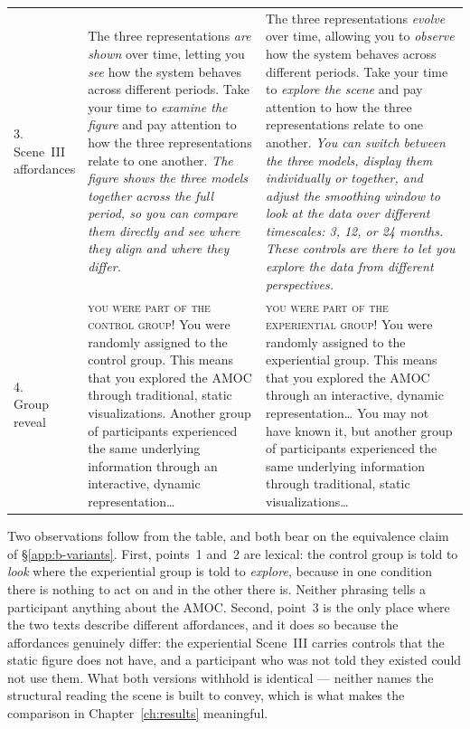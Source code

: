 \begin{table}[tbp]
\begin{tabularx}{\textwidth}{@{}p{2.3cm} X X@{}}
\makecell[l]{3.\\Scene~III\\affordances} &
The three representations \emph{are shown} over time, letting you \emph{see} how the system
behaves across different periods. Take your time to \emph{examine the figure} and pay attention
to how the three representations relate to one another. \emph{The figure shows the three models
together across the full period, so you can compare them directly and see where they align and
where they differ.} &
The three representations \emph{evolve} over time, allowing you to \emph{observe} how the system
behaves across different periods. Take your time to \emph{explore the scene} and pay attention
to how the three representations relate to one another. \emph{You can switch between the three
models, display them individually or together, and adjust the smoothing window to look at the
data over different timescales: 3, 12, or 24 months. These controls are there to let you explore
the data from different perspectives.} \\
\addlinespace

\makecell[l]{4.\\Group\\reveal} &
\textsc{you were part of the control group!} You were randomly assigned to the control group.
This means that you explored the AMOC through traditional, static visualizations. Another group
of participants experienced the same underlying information through an interactive, dynamic
representation\dots &
\textsc{you were part of the experiential group!} You were randomly assigned to the experiential
group. This means that you explored the AMOC through an interactive, dynamic representation\dots
You may not have known it, but another group of participants experienced the same underlying
information through traditional, static visualizations\dots \\

\bottomrule
\end{tabularx}
\end{table}

Two observations follow from the table, and both bear on the equivalence claim of
\S\ref{app:b-variants}. First, points~1 and~2 are lexical: the control group is told to
\emph{look} where the experiential group is told to \emph{explore}, because in one condition
there is nothing to act on and in the other there is. Neither phrasing tells a participant
anything about the AMOC. Second, point~3 is the only place where the two texts describe
different affordances, and it does so because the affordances genuinely differ: the experiential
Scene~III carries controls that the static figure does not have, and a participant who was not
told they existed could not use them. What both versions withhold is identical --- neither names
the structural reading the scene is built to convey, which is what makes the comparison in
Chapter~\ref{ch:results} meaningful.

